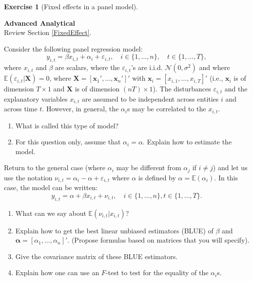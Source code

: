\documentclass[
  11pt,
]{book}
\theoremstyle{definition}
\theoremstyle{definition}
\theoremstyle{definition}
\newtheorem{exercise}{Exercise}[chapter]
\theoremstyle{definition}
\theoremstyle{remark}
\begin{document}
\begin{exercisebox}

\begin{exercise}[Fixed effects in a panel model]
\protect\hypertarget{exr:panel-fixed-effects}{}\label{exr:panel-fixed-effects}

\textbf{Advanced \textbar{} Analytical}\\
Review Section \ref{FixedEffect}.

Consider the following panel regression model: \[y_{i,t} = \beta x_{i,t} + \alpha_i + \varepsilon_{i,t}, \quad i \in \{1, \dots, n\}, \quad t \in \{1, \dots, T\},\] where \(x_{i,t}\) and \(\beta\) are scalars, where the \(\varepsilon_{i,t}\)'s are i.i.d. \(\mathcal{N}(0, \sigma^2)\) and where \(\mathbb{E}(\varepsilon_{i,t}|\mathbf{X}) = 0\), where \(\mathbf{X} = [\mathbf{x}_1', \dots, \mathbf{x}_n']'\) with \(\mathbf{x}_i = [x_{i,1}, \dots, x_{i,T}]'\) (i.e., \(\mathbf{x}_i\) is of dimension \(T \times 1\) and \(\mathbf{X}\) is of dimension \((nT) \times 1\)). The disturbances \(\varepsilon_{i,t}\) and the explanatory variables \(x_{i,t}\) are assumed to be independent across entities \(i\) and across time \(t\). However, in general, the \(\alpha_i\)s may be correlated to the \(x_{i,t}\).

\begin{enumerate}
\def\labelenumi{\arabic{enumi}.}
\item
  What is called this type of model?
\item
  For this question only, assume that \(\alpha_i=\alpha\). Explain how to estimate the model.
\end{enumerate}

Return to the general case (where \(\alpha_i\) may be different from \(\alpha_j\) if \(i \neq j\)) and let us use the notation \(\nu_{i,t} = \alpha_i - \alpha + \varepsilon_{i,t}\) where \(\alpha\) is defined by \(\alpha = \mathbb{E}(\alpha_i)\). In this case, the model can be written: \[y_{i,t} = \alpha + \beta x_{i,t} + \nu_{i,t}, \quad i \in \{1, \dots, n\}, t \in \{1, \dots, T\}.\]

\begin{enumerate}
\def\labelenumi{\arabic{enumi}.}
\setcounter{enumi}{2}
\item
  What can we say about \(\mathbb{E}(\nu_{i,t}|x_{i,t})\)?
\item
  Explain how to get the best linear unbiased estimators (BLUE) of \(\beta\) and \(\boldsymbol{\alpha} = [\alpha_1, \dots, \alpha_n]'\). (Propose formulas based on matrices that you will specify).
\item
  Give the covariance matrix of these BLUE estimators.
\item
  Explain how one can use an \(F\)-test to test for the equality of the \(\alpha_i\)s.
\end{enumerate}

\end{exercise}

\end{exercisebox}
\end{document}
